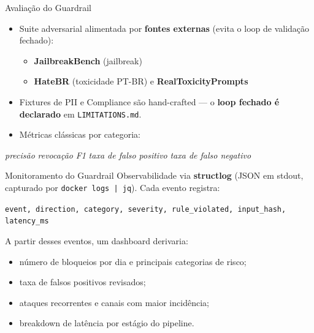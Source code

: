 \documentclass[aspectratio=169,11pt]{beamer}
\begin{document}
\begin{frame}{Avaliação do Guardrail}
  \begin{itemize}
    \item Suite adversarial alimentada por \textbf{fontes externas} (evita o
    loop de validação fechado):
    \begin{itemize}\small
      \item \textbf{JailbreakBench} (jailbreak)
      \item \textbf{HateBR} (toxicidade PT-BR) e \textbf{RealToxicityPrompts}
    \end{itemize}
    \item Fixtures de PII e Compliance são hand-crafted --- o \textbf{loop fechado
    é declarado} em \texttt{LIMITATIONS.md}.
    \item Métricas clássicas por categoria:
  \end{itemize}
  \vspace{0.3em}
  \begin{center}\small
  \emph{precisão} \quad\textbar\quad \emph{revocação} \quad\textbar\quad
  \emph{F1} \quad\textbar\quad \emph{taxa de falso positivo} \quad\textbar\quad
  \emph{taxa de falso negativo}
  \end{center}
\end{frame}

\begin{frame}{Monitoramento do Guardrail}
  Observabilidade via \textbf{structlog} (JSON em stdout, capturado por
  \texttt{docker logs | jq}). Cada evento registra:
  \vspace{0.6em}
  \begin{center}\small
  \texttt{event, direction, category, severity, rule\_violated, input\_hash, latency\_ms}
  \end{center}
  \vspace{0.8em}
  A partir desses eventos, um dashboard derivaria:
  \begin{itemize}
    \item número de bloqueios por dia e principais categorias de risco;
    \item taxa de falsos positivos revisados;
    \item ataques recorrentes e canais com maior incidência;
    \item breakdown de latência por estágio do pipeline.
  \end{itemize}
\end{frame}
\end{document}
